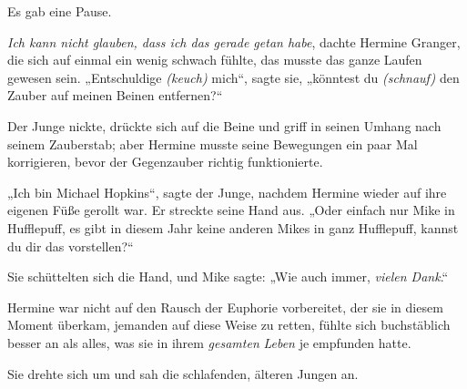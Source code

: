 Es gab eine Pause.

\emph{Ich kann nicht glauben, dass ich das gerade getan habe}, dachte Hermine Granger, die sich auf einmal ein wenig schwach fühlte, das musste das ganze Laufen gewesen sein.
„Entschuldige \emph{(keuch)} mich“, sagte sie, „könntest du \emph{(schnauf)} den Zauber auf meinen Beinen entfernen?“

Der Junge nickte, drückte sich auf die Beine und griff in seinen Umhang nach seinem Zauberstab; aber Hermine musste seine Bewegungen ein paar Mal korrigieren, bevor der Gegenzauber richtig funktionierte.

„Ich bin Michael Hopkins“, sagte der Junge, nachdem Hermine wieder auf ihre eigenen Füße gerollt war. Er streckte seine Hand aus.
„Oder einfach nur Mike in Hufflepuff, es gibt in diesem Jahr keine anderen Mikes in ganz Hufflepuff, kannst du dir das vorstellen?“

Sie schüttelten sich die Hand, und Mike sagte:
„Wie auch immer, \emph{vielen Dank}.“

Hermine war nicht auf den Rausch der Euphorie vorbereitet, der sie in diesem Moment überkam, jemanden auf diese Weise zu retten, fühlte sich buchstäblich besser an als alles, was sie in ihrem \emph{gesamten} \emph{Leben} je empfunden hatte.

Sie drehte sich um und sah die schlafenden, älteren Jungen an.

